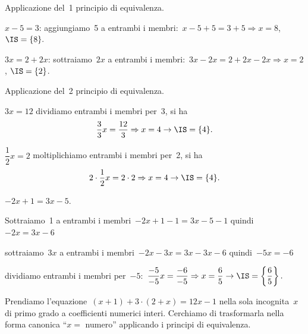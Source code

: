\begin{exrig}
 \begin{esempio}
Applicazione del~1{\textdegree} principio di equivalenza.

\begin{enumeratea}
\item \(x-5=3\):
aggiungiamo~5 a entrambi i membri:~\(x-5+5=3+5\Rightarrow x=8\), \(\IS =\{8\}.\)
\item \(3x=2+2x\): sottraiamo~\(2x\) a entrambi i membri:~\(3x-2x=2+2x-2x\Rightarrow 
x=2\),
\(\IS =\{2\}\).
\end{enumeratea}
 \end{esempio}


 \begin{esempio}
 Applicazione del~2{\textdegree} principio di equivalenza.

 \begin{enumeratea}
\item \(3x=12\) dividiamo entrambi i membri per~3, si ha
\[\dfrac{3}{3}x=\dfrac{12}{3}\Rightarrow x=4\to\IS =\{4\}.\]
\item \(\dfrac{1}{2}x=2\) moltiplichiamo entrambi i membri per~2, si ha
\[2\cdot {\dfrac{1}{2}}x=2\cdot 2\Rightarrow x=4\to\IS =\{4\}.\]
\end{enumeratea}
\end{esempio}


 \begin{esempio}
 \(-2x+1=3x-5\).

\begin{enumeratea}
 \item Sottraiamo~1 a entrambi i membri~\(-2x+1-1=3x-5-1\) quindi~\(-2x=3x-6\)
\item sottraiamo~\(3x\) a entrambi i membri~\(-2x-3x=3x-3x-6\) quindi~\(-5x=-6\)
\item dividiamo entrambi i membri 
per~\(-5\):~\(\dfrac{-5}{-5}x=\dfrac{-6}{-5}\Rightarrow x=\dfrac{6}{5}\rightarrow
\IS =\left\{\dfrac{6}{5}\right\}.\)
\end{enumeratea}
 \end{esempio}

 \begin{esempio}
Prendiamo l'equazione~\((x+1)+3\cdot (2+x)=12x-1\) nella
sola incognita~\(x\) di primo grado a coefficienti numerici interi.
Cerchiamo di trasformarla nella forma canonica ``\(x =\)
numero'' applicando i principi di equivalenza.


\end{esempio}
\end{exrig}
